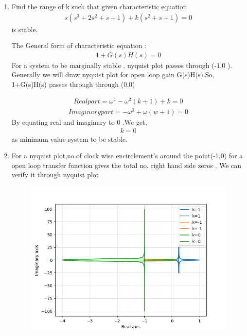 \begin{enumerate}[label=\thesection.\arabic*.,ref=\thesection.\theenumi]
\item Find the range of k such that given characteristic equation
\begin{align}
s(s^3+2s^2+s+1) +k(s^2+s+1) = 0
\label{eq:ee18btech11042_1}
\end{align}
is stable.

\solution
The General form of characteristic equation :
\begin{align}
1+G(s)H(s) = 0
\label{eq:ee18btech11042_2}    
\end{align}
\center 
    For a system to be marginally stable , nyquist plot passes through (-1,0 ). Generally we will draw nyquist plot for open loop gain G(s)H(s).So,  1+G(s)H(s) passes through through (0,0)

\begin{align}
Real part = \omega^4 - \omega^2(k+1) +k = 0
\label{eq:ee18btech11042_3}
\end{align}
\begin{align}
Imaginary part = -\omega^3 +\omega(w+1) = 0
\label{eq:ee18btech11042_4}
\end{align}
By equating real and imaginary to 0 .We get,
\begin{align}
k = 0
\label{eq:ee18btech11042_5}
\end{align}
as minimum value system to be stable.
\item For a nyquist plot,no.of clock wise encirclement's around the point(-1,0) for a open loop transfer function gives the total no. right hand side  zeros ,
We can verify it through nyquist plot

\begin{figure}[!h]
  \includegraphics[width=\columnwidth]{ee18btech11042_1.png}
  \label{fig:ee18btech11042_1.png}
\end{figure}



\end{enumerate}
